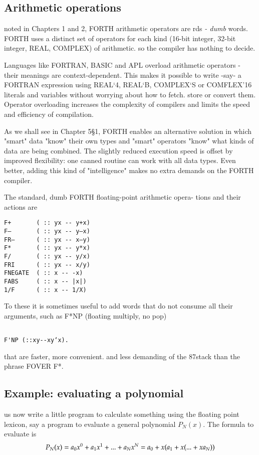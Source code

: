 \subsection{Arithmetic operations}
noted in Chapters 1 and 2, FORTH arithmetic operators are
rds \textit{- dumb} words. FORTH uses a distinct set of operators
for each kind (16-bit integer, 32-bit integer, REAL, COMPLEX)
of arithmetic. so the compiler has nothing to decide.

Languages like FORTRAN, BASIC and APL overload arithmetic operators - their
meanings are context-dependent. This
makes it possible to write -say- a FORTRAN expression using
REAL‘4, REAL‘B, COMPLEX‘S or COMFLEX’16 literals
and variables without worrying about how to fetch. store or
convert them. Operator overloading increases the complexity of
compilers and limits the speed and efficiency of compilation.

As we shall see in Chapter 5§1, FORTH enables an alternative
solution in which "smart" data "know" their own types and
"smart" operators "know" what kinds of data are being combined.
The slightly reduced execution speed is offset by improved
ﬂexibility: one canned routine can work with all data types. Even
better, adding this kind of "intelligence" makes no extra demands
on the FORTH compiler.

The standard, dumb FORTH floating-point arithmetic opera-
tions and their actions are

\begin{verbatim}
F+       ( :: yx -- y+x)
F—       ( :: yx -- y—x)
FR—      ( :: yx -- x—y)
F*       ( :: yx -- y*x)
F/       ( :: yx -- y/x)
FRI      ( :: yx -- x/y)
FNEGATE  ( :: x -- -x)
FABS     ( :: x -- |x|)
1/F      ( :: x -- 1/X)
\end{verbatim}

To these it is sometimes useful to add words that do not consume
all their arguments, such as F*NP (floating multiply, no pop)

\begin{verbatim}

F'NP (::xy--xy‘x).

\end{verbatim}

that are faster, more convenient. and less demanding of the
87stack than the phrase FOVER F*.

\subsection{Example: evaluating a polynomial}
 us now write a little program to calculate something using
the floating point lexicon, say a program to evaluate a general
polynomial $P_N (x)$. The formula to evaluate is
\begin{equation}
P_N(x)=a_0x^0+a_1x^1+...+a_Nx^N
\\
=a_0+x(a_1+x(... +xa_N))
\end{equation}


